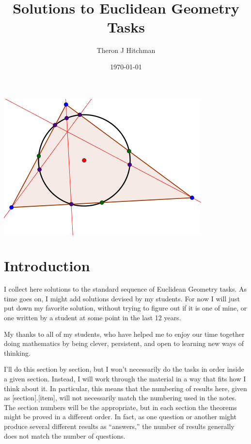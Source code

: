 \documentclass{tufte-handout}
\title[Solutions]{Solutions to Euclidean Geometry Tasks}
\author[Hitchman]{Theron J Hitchman}
\date{\today}
\theoremstyle{definition}
\begin{document}
\maketitle

\begin{marginfigure}
    \includegraphics{images/NPC.png}
\end{marginfigure}

\section*{Introduction}

I collect here solutions to the standard sequence of Euclidean Geometry tasks. As time goes on, I might add solutions devised by my students. For now I will just put down my favorite solution, without trying to figure out if it is one of mine, or one written by a student at some point in the last 12 years.

My thanks to all of my students, who have helped me to enjoy our time together doing mathematics by being clever, persistent, and open to learning new ways of thinking.

I'll do this section by section, but I won't necessarily do the tasks in order inside a given section. Instead, I will work through the material in a way that fits how I think about it. In particular, this means that the numbering of results here, given as [section].[item], will not necessarily match the numbering used in the notes. The section numbers will be the appropriate, but in each section the theorems might be proved in a different order. In fact, as one question or another might produce several different results as ``answers,'' the number of results generally does not match the number of questions.


\setcounter{section}{1}
\end{document}
